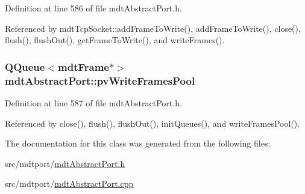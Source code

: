 Definition at line 586 of file mdt\-Abstract\-Port.\-h.



Referenced by mdt\-Tcp\-Socket\-::add\-Frame\-To\-Write(), add\-Frame\-To\-Write(), close(), flush(), flush\-Out(), get\-Frame\-To\-Write(), and write\-Frames().

\hypertarget{classmdt_abstract_port_a67a8b1965f20a55ad115926aed0234b4}{
\subsubsection[{pv\-Write\-Frames\-Pool}]{\setlength{\rightskip}{0pt plus 5cm}Q\-Queue$<${\bf mdt\-Frame}$\ast$$>$ mdt\-Abstract\-Port\-::pv\-Write\-Frames\-Pool\hspace{0.3cm}{\ttfamily [protected]}}}\label{classmdt_abstract_port_a67a8b1965f20a55ad115926aed0234b4}


Definition at line 587 of file mdt\-Abstract\-Port.\-h.



Referenced by close(), flush(), flush\-Out(), init\-Queues(), and write\-Frames\-Pool().



The documentation for this class was generated from the following files\-:\begin{DoxyCompactItemize}
\item 
src/mdtport/\hyperlink{mdt_abstract_port_8h}{mdt\-Abstract\-Port.\-h}\item 
src/mdtport/\hyperlink{mdt_abstract_port_8cpp}{mdt\-Abstract\-Port.\-cpp}\end{DoxyCompactItemize}
